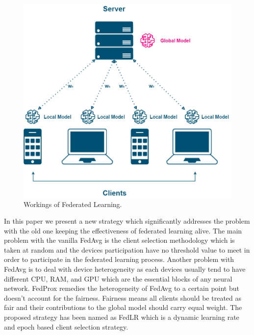 \documentclass[conference]{IEEEtran}
\begin{document}
\begin{figure}[htp!]
	\centering
	\includegraphics[scale=.25]{Images/FEDLEARN_NEW}
	\caption{Workings of Federated Learning.}
	\label{fig1}
\end{figure}

 In this paper we present a new strategy which significantly addresses the problem with the old one keeping the effectiveness of federated learning alive. The main problem with the vanilla FedAvg is the client selection methodology which is taken at random and the devices participation have no threshold value to meet in order to participate in the federated learning process. Another problem with FedAvg is to deal with device heterogeneity as each devices usually tend to have different CPU, RAM, and GPU which are the essential blocks of any neural network. FedProx \cite{li2020federated} remedies the heterogeneity of FedAvg to a certain point but doesn't account for the fairness. Fairness means all clients should be treated as fair and their contributions to the global model should carry equal weight. The proposed strategy has been named as FedLR which is a dynamic learning rate and epoch based client  selection strategy.
 
\end{document}

